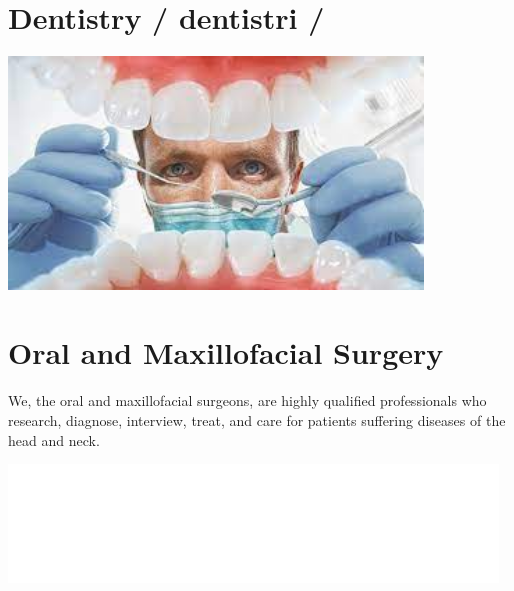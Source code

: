 \documentclass[
paper=landscape,
paper=160mm:90mm, %
fontsize=11pt, %
pagesize, %
parskip=half-, %
]{scrartcl} %
\theoremstyle{mythmstyle} %
\begin{document}


\section{Dentistry / dentistri /}

\begin{center}
    

\includegraphics[width=11cm]{Dentistry.png}
\end{center}

\section{Oral and Maxillofacial Surgery}

We, the oral and maxillofacial surgeons, are highly qualified professionals who research, diagnose, interview, treat, and care for patients suffering diseases of the head and neck.


\includegraphics[width=13cm]{TAOMS_LOGO.png}
\end{document}
